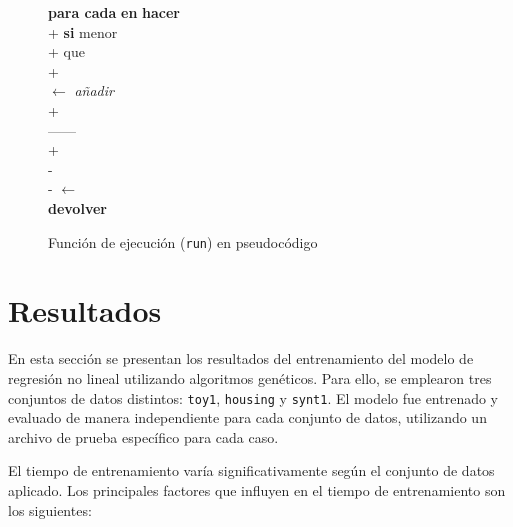 \documentclass[conference,a4paper]{IEEEtran}
\begin{document}
\begin{figure}[H]
\begin{pseudo}
            \textbf{para cada} \textit{} \textbf{en} \textit{} \textbf{hacer} \\+
                \textbf{si}  menor\\+
                que  \\+
                     \\
                     \(\leftarrow\) \textit{añadir}\\+  \\------
        \\+
         \\-
         \\-
    \textit{} \(\leftarrow\) 
    \\
    \textbf{devolver} 
     \\
  \end{pseudo}
  \caption{Función de ejecución (\texttt{run}) en pseudocódigo}
  \label{pcd:run}
\end{figure}









\section{Resultados}

En esta sección se presentan los resultados del entrenamiento del modelo de regresión no lineal utilizando algoritmos genéticos. Para ello, se emplearon tres conjuntos de datos distintos: \texttt{toy1}, \texttt{housing} y \texttt{synt1}. El modelo fue entrenado y evaluado de manera independiente para cada conjunto de datos, utilizando un archivo de prueba específico para cada caso.

El tiempo de entrenamiento varía significativamente según el conjunto de datos aplicado. Los principales factores que influyen en el tiempo de entrenamiento son los siguientes:
\end{document}

